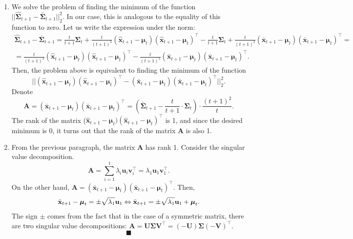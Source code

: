 \documentclass{article}
\begin{document}
{\begin{enumerate}
	\item We solve the problem of finding the minimum of the function $||\hat{\mathbf{\Sigma}}_{t+1} - \bar{\mathbf{\Sigma}}_{t+1}||_2^2$. In our case, this is analogous to the equality of this function to zero. Let us write the expression under the norm:
	\begin{gather*}
		\hat{\mathbf{\Sigma}}_{t+1} - \bar{\mathbf{\Sigma}}_{t+1} = \frac{t}{t+1}\mathbf{\Sigma}_t + \frac{t}{(t+1)^2}(\hat{\mathbf{x}}_{t+1}-\boldsymbol{\mu}_t)(\hat{\mathbf{x}}_{t+1}-\boldsymbol{\mu}_t)^\intercal - \frac{t}{t+1}\mathbf{\Sigma}_t + \frac{t}{(t+1)^2}(\bar{\mathbf{x}}_{t+1}-\boldsymbol{\mu}_t)(\bar{\mathbf{x}}_{t+1}-\boldsymbol{\mu}_t)^\intercal =\\
		=\frac{t}{(t+1)^2}(\hat{\mathbf{x}}_{t+1}-\boldsymbol{\mu}_t)(\hat{\mathbf{x}}_{t+1}-\boldsymbol{\mu}_t)^\intercal -\frac{t}{(t+1)^2}(\bar{\mathbf{x}}_{t+1}-\boldsymbol{\mu}_t)(\bar{\mathbf{x}}_{t+1}-\boldsymbol{\mu}_t)^\intercal.
 	\end{gather*}
 	Then, the problem above is equivalent to finding the minimum of the function \[||(\hat{\mathbf{x}}_{t+1}-\boldsymbol{\mu}_t)(\hat{\mathbf{x}}_{t+1}-\boldsymbol{\mu}_t)^\intercal-(\bar{\mathbf{x}}_{t+1}-\boldsymbol{\mu}_t)(\bar{\mathbf{x}}_{t+1}-\boldsymbol{\mu}_t)^\intercal||_2^2.\]
 	Denote \[\mathbf{A} = (\bar{\mathbf{x}}_{t+1}-\boldsymbol{\mu}_t)(\bar{\mathbf{x}}_{t+1}-\boldsymbol{\mu}_t)^\intercal = \left(\bar{\mathbf{\Sigma}}_{t+1} - \frac{t}{t+1} \cdot \mathbf{\Sigma}_t \right) \cdot \frac{(t+1)^2}{t}.\]
 	The rank of the matrix ($\hat{\mathbf{x}}_{t+1}-\boldsymbol{\mu}_t)(\hat{\mathbf{x}}_{t+1}-\boldsymbol{\mu}_t)^\intercal$ is 1, and since the desired minimum is 0, it turns out that the rank of the matrix $\mathbf{A}$ is also 1.
 	
 	\item From the previous paragraph, the matrix $\mathbf{A}$ has rank 1. Consider the singular value decomposition. \[
 		\mathbf{A} = \sum_{i=1}^{1} \lambda_i \mathbf{u}_i \mathbf{v}_i^\intercal = \lambda_1 \mathbf{u}_1 \mathbf{v}_1^\intercal.
 	\]
 	On the other hand, $\mathbf{A} = (\bar{\mathbf{x}}_{t+1}-\boldsymbol{\mu}_t)(\bar{\mathbf{x}}_{t+1}-\boldsymbol{\mu}_t)^\intercal$. Then, \[
 	\bar{\mathbf{x}}_{t+1}-\boldsymbol{\mu}_t = \pm\sqrt{\lambda_1} \mathbf{u}_1 \Leftrightarrow\\
 	\bar{\mathbf{x}}_{t+1} = \pm\sqrt{\lambda_1} \mathbf{u}_1 + \boldsymbol{\mu}_t.
 	\]
 	The sign $\pm$ comes from the fact that in the case of a symmetric matrix, there are two singular value decompositions: $\mathbf{A}=\mathbf{U}\mathbf{\Sigma} \mathbf{V}^\intercal=(-\mathbf{U})\mathbf{\Sigma} (-\mathbf{V})^\intercal$.
 	$$ \blacksquare $$
\end{enumerate}

}
\end{document}

